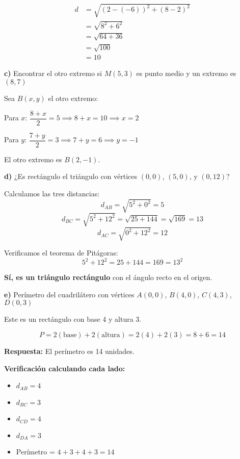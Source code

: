\begin{align*}
d &= \sqrt{(2-(-6))^2 + (8-2)^2} \\
  &= \sqrt{8^2 + 6^2} \\
  &= \sqrt{64 + 36} \\
  &= \sqrt{100} \\
  &= 10
\end{align*}

\medskip

\textbf{c)} Encontrar el otro extremo si $M(5, 3)$ es punto medio y un extremo es $(8, 7)$

Sea $B(x, y)$ el otro extremo:

Para $x$: $\dfrac{8 + x}{2} = 5 \implies 8 + x = 10 \implies x = 2$

Para $y$: $\dfrac{7 + y}{2} = 3 \implies 7 + y = 6 \implies y = -1$

El otro extremo es $B(2, -1)$.

\medskip

\textbf{d)} ¿Es rectángulo el triángulo con vértices $(0, 0)$, $(5, 0)$, y $(0, 12)$?

Calculamos las tres distancias:
$$d_{AB} = \sqrt{5^2 + 0^2} = 5$$
$$d_{BC} = \sqrt{5^2 + 12^2} = \sqrt{25 + 144} = \sqrt{169} = 13$$
$$d_{AC} = \sqrt{0^2 + 12^2} = 12$$

Verificamos el teorema de Pitágoras:
$$5^2 + 12^2 = 25 + 144 = 169 = 13^2$$ \checkmark

\textbf{Sí, es un triángulo rectángulo} con el ángulo recto en el origen.

\medskip

\textbf{e)} Perímetro del cuadrilátero con vértices $A(0, 0)$, $B(4, 0)$, $C(4, 3)$, $D(0, 3)$

Este es un rectángulo con base 4 y altura 3.

$$P = 2(\text{base}) + 2(\text{altura}) = 2(4) + 2(3) = 8 + 6 = 14$$

\textbf{Respuesta:} El perímetro es 14 unidades.

\textbf{Verificación calculando cada lado:}
\begin{itemize}
    \item $d_{AB} = 4$
    \item $d_{BC} = 3$
    \item $d_{CD} = 4$
    \item $d_{DA} = 3$
    \item Perímetro = $4 + 3 + 4 + 3 = 14$ \checkmark
\end{itemize}
